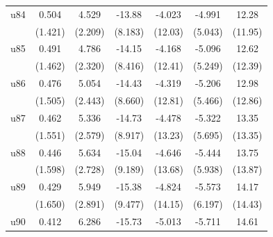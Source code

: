 \begin{table}[htbp]
\begin{tabular}{l*{6}{c}}
\addlinespace
u84                 &       0.504         &       4.529\sym{**} &      -13.88\sym{*}  &      -4.023         &      -4.991         &       12.28         \\
                    &     (1.421)         &     (2.209)         &     (8.183)         &     (12.03)         &     (5.043)         &     (11.95)         \\
\addlinespace
u85                 &       0.491         &       4.786\sym{**} &      -14.15\sym{*}  &      -4.168         &      -5.096         &       12.62         \\
                    &     (1.462)         &     (2.320)         &     (8.416)         &     (12.41)         &     (5.249)         &     (12.39)         \\
\addlinespace
u86                 &       0.476         &       5.054\sym{**} &      -14.43\sym{*}  &      -4.319         &      -5.206         &       12.98         \\
                    &     (1.505)         &     (2.443)         &     (8.660)         &     (12.81)         &     (5.466)         &     (12.86)         \\
\addlinespace
u87                 &       0.462         &       5.336\sym{**} &      -14.73\sym{*}  &      -4.478         &      -5.322         &       13.35         \\
                    &     (1.551)         &     (2.579)         &     (8.917)         &     (13.23)         &     (5.695)         &     (13.35)         \\
\addlinespace
u88                 &       0.446         &       5.634\sym{**} &      -15.04         &      -4.646         &      -5.444         &       13.75         \\
                    &     (1.598)         &     (2.728)         &     (9.189)         &     (13.68)         &     (5.938)         &     (13.87)         \\
\addlinespace
u89                 &       0.429         &       5.949\sym{**} &      -15.38         &      -4.824         &      -5.573         &       14.17         \\
                    &     (1.650)         &     (2.891)         &     (9.477)         &     (14.15)         &     (6.197)         &     (14.43)         \\
\addlinespace
u90                 &       0.412         &       6.286\sym{**} &      -15.73         &      -5.013         &      -5.711         &       14.61         \\

\end{tabular}
\end{table}
